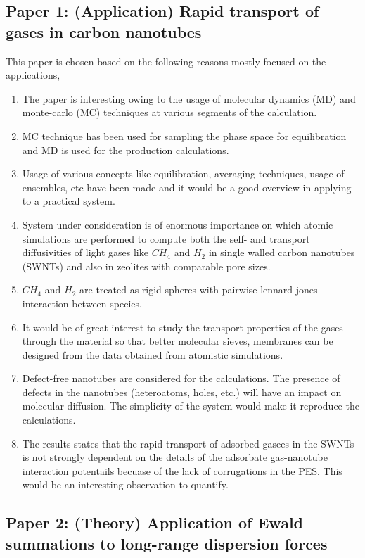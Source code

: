 \documentclass{article}
\begin{document}
\subsection{Paper 1: (Application) Rapid transport of gases in carbon nanotubes}
\label{sec-2-1}

This paper is chosen based on the following reasons mostly focused on the applications,

\begin{enumerate}
\item The paper is interesting owing to the usage of molecular dynamics (MD) and monte-carlo (MC) techniques at various segments of the calculation.
\item MC technique has been used for sampling the phase space for equilibration and MD is used for the production calculations.
\item Usage of various concepts like equilibration, averaging techniques, usage of ensembles, etc have been made and it would be a good overview in applying to a practical system.
\item System under consideration is of enormous importance on which atomic simulations are performed to compute both the self- and transport diffusivities of light gases like $CH_4$ and $H_2$ in single walled carbon nanotubes (SWNTs) and also in zeolites with comparable pore sizes.
\item $CH_4$ and $H_2$ are treated as rigid spheres with pairwise lennard-jones interaction between species.
\item It would be of great interest to study the transport properties of the gases through the material so that better molecular sieves, membranes can be designed from the data obtained from atomistic simulations.
\item Defect-free nanotubes are considered for the calculations. The presence of defects in the nanotubes (heteroatoms, holes, etc.) will have an impact on molecular diffusion. The simplicity of the system would make it reproduce the calculations.
\item The results states that the rapid transport of adsorbed gasees in the SWNTs is not strongly dependent on the details of the adsorbate gas-nanotube interaction potentails becuase of the lack of corrugations in the PES. This would be an interesting observation to quantify.
\end{enumerate}

\subsection{Paper 2: (Theory) Application of Ewald summations to long-range dispersion forces}
\label{sec-2-2}
\end{document}
